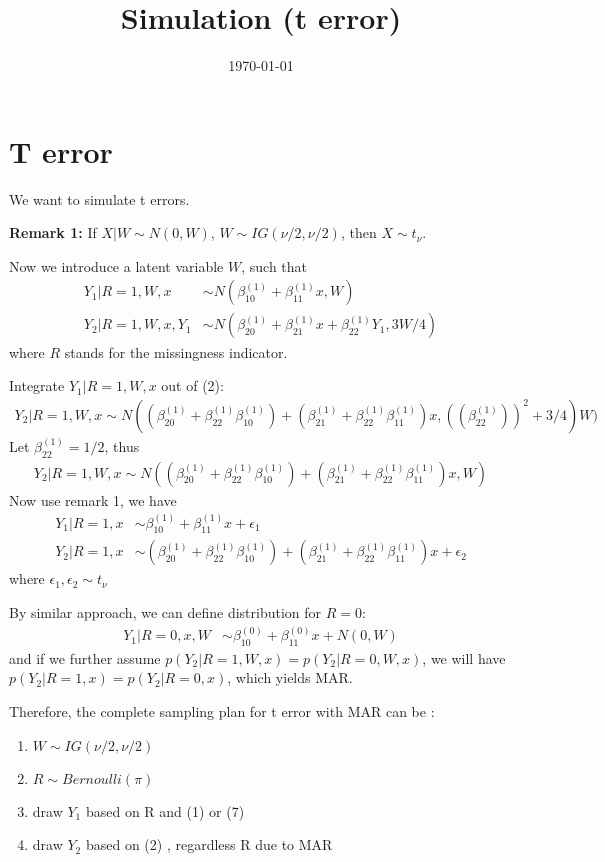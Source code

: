 \documentclass[12pt]{article}
\title{Simulation (t error)}
\date{\today}
\author{}
\begin{document}
\section{T error}
We want to simulate t errors.

\textbf{Remark 1:}
If $X|W \sim N(0, W)$, $W \sim IG(\nu/2, \nu/2)$, then $X \sim t_{\nu}$.

Now we introduce a latent variable $W$, such that
\begin{align}
Y_1 | R = 1, W, x & \sim  N(\beta_{10}^{(1)} + \beta_{11}^{(1)}x, W) \\
Y_2 | R = 1, W, x, Y_1 &\sim  N(\beta_{20}^{(1)} + \beta_{21}^{(1)}x + \beta_{22}^{(1)}Y_1, 3W/4)
\end{align}
where $R$ stands for the missingness indicator.

Integrate $Y_1|R = 1, W, x$ out of (2):
\begin{align}
Y_2 | R = 1, W, x \sim N ( (\beta_{20}^{(1)} + \beta_{22}^{(1)}\beta_{10}^{(1)}) + (\beta_{21}^{(1)} + \beta_{22}^{(1)}\beta_{11}^{(1)})x, ((\beta_{22}^{(1)}))^2 + 3/4)W)
\end{align}
Let $\beta_{22}^{(1)} = 1/2$, thus
\begin{align}
Y_2 | R = 1, W, x \sim N ( (\beta_{20}^{(1)} + \beta_{22}^{(1)}\beta_{10}^{(1)}) + (\beta_{21}^{(1)} + \beta_{22}^{(1)}\beta_{11}^{(1)})x, W)
\end{align}
Now use remark 1, we have
\begin{align}
Y_1|R = 1, x & \sim \beta_{10}^{(1)} + \beta_{11}^{(1)}x + \epsilon_1 \\
Y_2|R = 1, x & \sim (\beta_{20}^{(1)} + \beta_{22}^{(1)}\beta_{10}^{(1)}) + (\beta_{21}^{(1)} + \beta_{22}^{(1)}\beta_{11}^{(1)})x + \epsilon_2
\end{align}
where $\epsilon_1, \epsilon_2 \sim t_{\nu}$

By similar approach, we can define distribution for $R = 0$:
\begin{align}
Y_1|R = 0, x , W& \sim \beta_{10}^{(0)} + \beta_{11}^{(0)}x + N(0, W)
\end{align}
and if we further assume $p(Y_2 | R= 1, W, x) = p(Y_2|R = 0, W, x) $, we
will have $p(Y_2|R = 1, x) = p(Y_2|R =0, x)$, which yields MAR.

Therefore, the complete sampling plan for t error with MAR can be :
\begin{enumerate}
\item $W \sim IG(\nu/2, \nu/2)$
\item $R \sim Bernoulli(\pi)$
\item draw $Y_1$ based on R and  (1) or (7)
\item draw $Y_2$ based on (2) , regardless R due to MAR
\end{enumerate}
\end{document}
